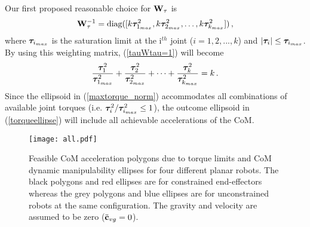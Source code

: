 Our first proposed reasonable choice for $\mathbf{W}_\tau$ is
%
\begin{equation}
\mathbf{W}_\tau^{-1} = \textrm{diag} ([k \boldsymbol{\tau}_{1_{max}}^2, k \boldsymbol{\tau}_{2_{max}}^2,
\ldots, k \boldsymbol{\tau}_{k_{max}}^2]) \, ,
\label{W_tau}
\end{equation}
%
where $\boldsymbol{\tau}_{i_{max}}$ is the saturation limit at the i$^{th}$ joint ($i = 1,
2, ..., k$) and $|\boldsymbol{\tau}_i| \leq \boldsymbol{\tau}_{i_{max}}$.  By using this weighting
matrix, (\ref{tauWtau=1}) will become
%
\begin{equation}
\frac{\boldsymbol{\tau}_1^2}{\boldsymbol{\tau}_{1_{max}}^2} + \frac{\boldsymbol{\tau}_2^2}{\boldsymbol{\tau}_{2_{max}}^2} +
\cdots + \frac{\boldsymbol{\tau}_k^2}{\boldsymbol{\tau}_{k_{max}}^2} = k \, .
\label{maxtorque_norm}
\end{equation}
%
Since the ellipsoid in (\ref{maxtorque_norm}) accommodates all combinations of
available joint torques (i.e.  $\boldsymbol{\tau}_i^2 / \boldsymbol{\tau}_{i_{max}}^2\leq 1$), the
outcome ellipsoid in (\ref{torqueellipse}) will include all achievable
accelerations of the CoM.
%
\begin{figure}
	\centering \texttt{[image: all.pdf]}
	\caption{Feasible CoM acceleration polygons due to torque limits and CoM
		dynamic manipulability ellipses for four different planar robots.  The
		black polygons and red ellipses are for constrained end-effectors whereas
		the grey polygons and blue ellipses are for unconstrained robots at the
		same configuration.  The gravity and velocity are assumed to be zero
		($\ddot{\mathbf{c}}_{vg}=0$).}
	\label{torque_ellipses}
\end{figure}
%

